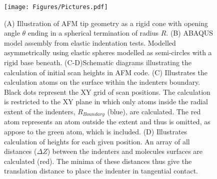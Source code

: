 \begin{figure}[H]
    \centering
    \texttt{[image: Figures/Pictures.pdf]}   
    \caption{\label{fig: ABAQUS Model-Setup} (A) Illustration of AFM tip geometry as a rigid cone with opening angle $\theta$ ending in a spherical termination of radius $R$. (B) ABAQUS model assembly from elastic indentation tests. Modelled asymmetrically using elastic spheres modelled as semi-circles with a rigid base beneath. (C-D)Schematic diagrams illustrating the calculation of initial scan heights in AFM code. (C) Illustrates the calculation atoms on the surface within the indenters boundary. Black dots represent the XY grid of scan positions. The calculation is restricted to the XY plane in which only atoms inside the radial extent of the indenters, $R_{Boundary}$ (blue), are calculated. The red atom represents an atom outside the extent and thus is omitted, as appose to the green atom, which is included. (D) Illustrates calculation of heights for each given position. An array of all distances ($\Delta Z$) between the indenters and molecules surfaces are calculated (red). The minima of these distances thus give the translation distance to place the indenter in tangential contact.} 
    
\end{figure}
